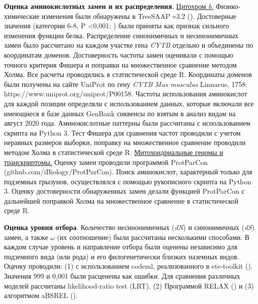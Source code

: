 \textbf{Оценка аминокислотных замен и их распределения}. \underline{Цитохром \textit{b}.} Физико-химические изменения были обнаружены в TreeSAAP v3.2 (\cite{Woolley2003}). Достоверные значения (категории 6-8, P <0,001; \cite{McClellan2001}) были приняты как признак сильного изменения функции белка. Распределение синонимичных и несинонимичных замен было рассчитано на каждом участке гена \textit{CYTB} отдельно и объединены по координатам доменов. Достоверность частоты замен оценивали с помощью точного критерия Фишера и поправки на множественное сравнение методом Холма. Все расчеты проводились в статистической среде R. Координаты доменов были получены на сайте UniProt по гену \textit{CYTB} \textit{Mus musculus} Linnaeus, 1758: https://www.uniprot.org/uniprot/P00158. Частоты использования аминокислот для каждой позиции определяли с использованием данных, которые включали все имеющиеся в базе данных GenBank сиквенсы по взятым в анализ видам на август 2020 года. Аминокислотные паттерны были рассчитаны с использованием скрипта на Python 3. Тест Фишера для сравнения частот проводили с учетом неравных размеров выборки, поправку на множественное сравнение проводили методом Холма в статистической среде R. \underline{Митохондриальные геномы и транскриптомы.} Оценку замен проводили программой ProtParCon (github.com/iBiology/ProtParCon). Поиск аминокислот, характерный только для подземных грызунов, осуществлялся с помощью рукописного скрипта на Python 3. Оценку достоверности обнаруженных замен делали функцией ProtParCon с дальнейшей поправкой Холма на множественное сравнение в статистической среде R. 

\textbf{Оценка уровня отбора}. Количество несинонимичных (\textit{dN}) и синонимичных (\textit{dS}) замен, а также $\omega$ (их соотношение) были рассчитаны несколькими способами. В каждом случае уровень и направление отбора были оценены независимо для подземного вида (или рода) и его филогенетически близких наземных видов. Оценку проводили: (1) с использованием codeml, реализованного в ete-toolkit (\cite{Huerta-Cepas2016}). Значения 999 и 0,001 были расценены как ошибки. Для сравнения различных моделей рассчитаны likelihood-ratio test (LRT). (2) Программой RELAX (\cite{Wertheim2015}) и (3) алгоритмом aBSREL (\cite{Smith2015}).     


